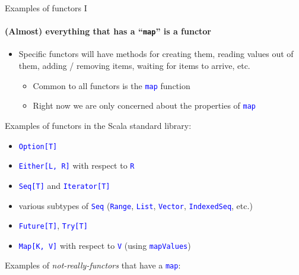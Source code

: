 \documentclass[english]{beamer}
\begin{document}
\begin{frame}{Examples of functors I}


\framesubtitle{(Almost) everything that has a ``\texttt{map}'' is a functor}
\begin{itemize}
\item Specific functors will have methods for creating them, reading values
out of them, adding / removing items, waiting for items to arrive,
etc.
\begin{itemize}
\item Common to all functors is the \texttt{\textcolor{blue}{\footnotesize{}map}}
function
\item Right now we are only concerned about the properties of \texttt{\textcolor{blue}{\footnotesize{}map}}{\footnotesize \par}
\end{itemize}
\end{itemize}
Examples of functors in the Scala standard library:
\begin{itemize}
\item \texttt{\textcolor{blue}{\footnotesize{}Option{[}T{]}}}{\footnotesize \par}
\item \texttt{\textcolor{blue}{\footnotesize{}Either{[}L, R{]}}} with respect
to \texttt{\textcolor{blue}{\footnotesize{}R}}{\footnotesize \par}
\item \texttt{\textcolor{blue}{\footnotesize{}Seq{[}T{]}}} and \texttt{\textcolor{blue}{\footnotesize{}Iterator{[}T{]} }}{\footnotesize \par}
\item various subtypes of \texttt{\textcolor{blue}{\footnotesize{}Seq}}
(\texttt{\textcolor{blue}{\footnotesize{}Range}}, \texttt{\textcolor{blue}{\footnotesize{}List}},
\texttt{\textcolor{blue}{\footnotesize{}Vector}}, \texttt{\textcolor{blue}{\footnotesize{}IndexedSeq}},
etc.)
\item \texttt{\textcolor{blue}{\footnotesize{}Future{[}T{]}}}, \texttt{\textcolor{blue}{\footnotesize{}Try{[}T{]}}}{\footnotesize \par}
\item \texttt{\textcolor{blue}{\footnotesize{}Map{[}K, V{]}}} with respect
to \texttt{\textcolor{blue}{\footnotesize{}V}} (using \texttt{\textcolor{blue}{\footnotesize{}mapValues}})
\end{itemize}
Examples of \emph{not-really-functors} that have a \texttt{\textcolor{blue}{\footnotesize{}map}}:
\begin{itemize}

\end{itemize}
\end{frame}
\end{document}
